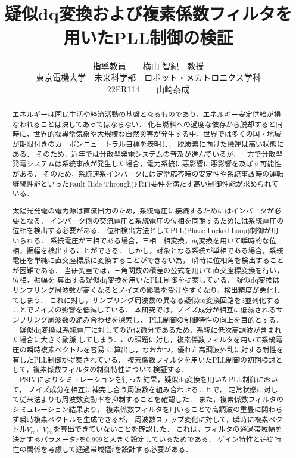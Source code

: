\documentclass[a4j,11pt,onecolumn,oneside,fleqn,final]{sty_file/s_report}
\title{\vspace{-20mm}{\Large 令和7年度\\\ 卒\ 業\ 論\ 文} \vspace{15mm}\\
疑似dq変換および複素係数フィルタを用いたPLL制御の検証\vspace{50mm}}
\author{指導教員~~~~横山 智紀　教授 \vspace{10mm}\\ 東京電機大学　未来科学部　ロボット・メカトロニクス学科 \\  22FR114~~~~山崎泰成}
\date{}
\begin{document}
\maketitle

\begin{abstract}

エネルギーは国民生活や経済活動の基盤となるものであり，エネルギー安定供給が損なわれることは決してあってはならない．
化石燃料への過度な依存から脱却すると同時に，世界的な異常気象や大規模な自然災害が発生する中，世界では多くの国・地域が期限付きのカーボンニュートラル目標を表明し，
脱炭素に向けた機運は高い状態にある．
そのため，近年では分散型発電システムの普及が進んでいるが，一方で分散型発電システムは系統事故が発生した場合，電力系統に悪影響に悪影響を及ぼす可能性がある．
そのため，系統連系インバータには定常応答時の安定性や系統事故時の運転継続性能といったFault Ride Through(FRT)要件を満たす高い制御性能が求められている．\par
太陽光発電の電力源は直流出力のため，系統電圧に接続するためにはインバータが必要となる．
インバータ側の交流電圧と系統電圧の位相を同期するためには系統電圧の位相を検出する必要がある．
位相検出方法としてPLL(Phase Locked Loop)制御が用いられる．
系統電圧が三相である場合，三相二相変換，$dq$変換を用いて瞬時的な位相，振幅を検出することができる．
しかし，対象となる系統が単相である場合，系統電圧を単純に直交座標系に変換することができない為，
瞬時に位相角を検出することが困難である．
当研究室では，三角関数の積差の公式を用いて直交座標変換を行い，位相，振幅を
算出する疑似dq変換を用いたPLL制御を提案している．
疑似dq変換はサンプリング周波数が高くなるとノイズの影響を受けやすくなり，検出精度が悪化してしまう．
これに対し，サンプリング周波数の異なる疑似dq変換回路を3並列化することでノイズの影響を低減している．
本研究では，ノイズ成分が相互に低減されるサンプリング周波数の組み合わせを探索し，
PLL制御の制御特性の向上を目的とする．\\
　疑似dq変換は系統電圧に対しての近似微分であるため，系統に低次高調波が含まれた場合に大きく動脈
してしまう．この課題に対し，複素係数フィルタを用いて系統電圧の瞬時複素ベクトルを容易
に算出し，なおかつ，優れた高調波外乱に対する耐性を有したPLL制御が提案されている．
複素係数フィルタを用いたPLL制御の初期検討として，複素係数フィルタの制御特性について検証する．\\
　PSIMによりシミュレーションを行った結果，疑似dq変換を用いたPLL制御において，
ノイズ成分を相互に補完し合う周波数を組み合わせることで，
定常状態に対して従来法よりも周波数変動率を抑制することを確認した．
また，複素係数フィルタのシミュレーション結果より，
複素係数フィルタを用いることで高調波の重畳に関わらず瞬時複素ベクトルを生成できるが，
周波数ステップ変化に対して，瞬時に複素ベクトル$V_{re} ，V_{im}$を算出できていないことを確認した．
これは，フィルタの通過帯域幅を決定するパラメータ$r$を0.999と大きく設定しているためである．
ゲイン特性と追従特性の関係を考慮して通過帯域幅$r$を設計する必要がある．
\end{abstract}
\end{document}
